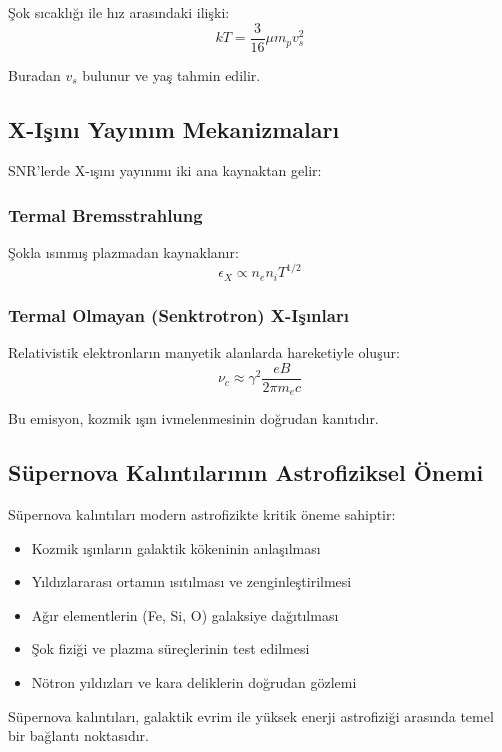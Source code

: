 Şok sıcaklığı ile hız arasındaki ilişki:
\begin{equation}
kT = \frac{3}{16} \mu m_p v_s^2
\end{equation}

Buradan $v_s$ bulunur ve yaş tahmin edilir.

\subsection{X-Işını Yayınım Mekanizmaları}

SNR'lerde X-ışını yayınımı iki ana kaynaktan gelir:

\subsubsection{Termal Bremsstrahlung}

Şokla ısınmış plazmadan kaynaklanır:
\begin{equation}
\epsilon_X \propto n_e n_i T^{1/2}
\end{equation}

\subsubsection{Termal Olmayan (Senktrotron) X-Işınları}

Relativistik elektronların manyetik alanlarda hareketiyle oluşur:
\begin{equation}
\nu_c \approx \gamma^2 \frac{eB}{2\pi m_e c}
\end{equation}

Bu emisyon, kozmik ışın ivmelenmesinin doğrudan kanıtıdır.

\subsection{Süpernova Kalıntılarının Astrofiziksel Önemi}

Süpernova kalıntıları modern astrofizikte kritik öneme sahiptir:
\begin{itemize}
    \item Kozmik ışınların galaktik kökeninin anlaşılması
    \item Yıldızlararası ortamın ısıtılması ve zenginleştirilmesi
    \item Ağır elementlerin (Fe, Si, O) galaksiye dağıtılması
    \item Şok fiziği ve plazma süreçlerinin test edilmesi
    \item Nötron yıldızları ve kara deliklerin doğrudan gözlemi
\end{itemize}

Süpernova kalıntıları, galaktik evrim ile yüksek enerji astrofiziği arasında temel bir bağlantı noktasıdır.
